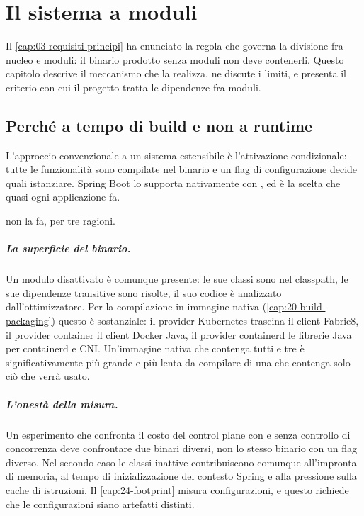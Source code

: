 \chapter{Il sistema a moduli}
\label{cap:08-sistema-moduli}

Il \cref{cap:03-requisiti-principi} ha enunciato la regola che governa la
divisione fra nucleo e moduli: il binario prodotto senza moduli non deve
contenerli. Questo capitolo descrive il meccanismo che la realizza, ne discute i
limiti, e presenta il criterio con cui il progetto tratta le dipendenze fra
moduli.

\section{Perch\'e a tempo di build e non a runtime}

L'approccio convenzionale a un sistema estensibile \`e l'attivazione
condizionale: tutte le funzionalit\`a sono compilate nel binario e un flag di
configurazione decide quali istanziare. Spring Boot lo supporta nativamente con
, ed \`e la scelta che quasi ogni applicazione fa.

\nf{} non la fa, per tre ragioni.

\paragraph{La superficie del binario.} Un modulo disattivato \`e comunque
presente: le sue classi sono nel classpath, le sue dipendenze transitive sono
risolte, il suo codice \`e analizzato dall'ottimizzatore. Per la compilazione
in immagine nativa (\cref{cap:20-build-packaging}) questo \`e sostanziale: il
provider Kubernetes trascina il client Fabric8, il provider container il
client Docker Java, il provider containerd le librerie Java per containerd e
CNI. Un'immagine nativa che contenga tutti e tre \`e significativamente pi\`u
grande e pi\`u lenta da compilare di una che contenga solo ci\`o che verr\`a
usato.

\paragraph{L'onest\`a della misura.} Un esperimento che confronta il costo del
control plane con e senza controllo di concorrenza deve confrontare due binari
diversi, non lo stesso binario con un flag diverso. Nel secondo caso le classi
inattive contribuiscono comunque all'impronta di memoria, al tempo di
inizializzazione del contesto Spring e alla pressione sulla cache di istruzioni.
Il \cref{cap:24-footprint} misura configurazioni, e questo richiede che le
configurazioni siano artefatti distinti.

